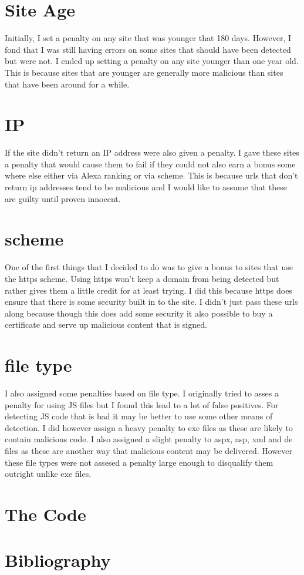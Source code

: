 \documentclass[letterpaper, onecolumn,10pt]{IEEEtran}
\begin{document}
		\section{Site Age}
		Initially, I set a penalty on any site that was younger that 180 days. However, I fond that I was still having errors on some sites that should have been detected but were not. I ended up setting a penalty on any site younger than one year old. This is because sites that are younger are generally more malicious than sites that have been around for a while.\\
		
		\section{IP}
		If the site didn't return an IP address were also given a penalty. I gave these sites a penalty that would cause them to fail if they could not also earn a bonus some where else either via Alexa ranking or via scheme. This is because urls that don't return ip addresses tend to be malicious and I would like to assume that these are guilty until proven innocent.\\
		
		\section{scheme}
		One of the first things that I decided to do was to give a bonus to sites that use the https scheme. Using https won't keep a domain from being detected but rather gives them a little credit for at least trying. I did this because https does ensure that there is some security built in to the site. I didn't just pass these urls along because though this does add some security it also possible to buy a certificate and serve up malicious content that is signed.\\
		
		\section{file type}
		I also assigned some penalties based on file type. I originally tried to asses a penalty for using JS files but I found this lead to a lot of false positives. For detecting JS code that is bad it may be better to use some other means of detection. I did however assign a heavy penalty to exe files as these are likely to contain malicious code. I also assigned  a slight penalty to aspx, asp, xml and de files as these are another way that malicious content may be delivered. However these file types were not assesed a penalty large enough to disqualify them outright unlike exe files.\\
		
		\section{The Code}
		
		
		
		
			
		\section{Bibliography}
		
		
\end{document}
